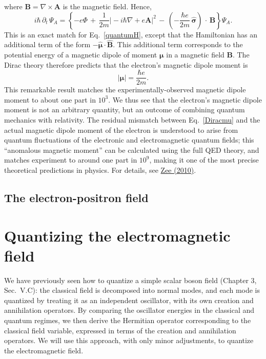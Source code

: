 \documentclass[pra,12pt]{revtex4}
\begin{document}
where $\mathbf{B} = \nabla\times\mathbf{A}$ is the magnetic field.
Hence,
\begin{equation}
  i\hbar\, \partial_t \, \Psi_A
  = \left\{-e\Phi
  \,+\, \frac{1}{2m} \big|-i\hbar\nabla +e\mathbf{A} \big|^2
  \,-\, \left(-\frac{\hbar e}{2m}\, \hat{\boldsymbol{\sigma}}\right)
  \,\cdot\, \mathbf{B} \right\} \Psi_A.
\end{equation}
This is an exact match for Eq.~\eqref{quantumH}, except that the
Hamiltonian has an additional term of the form $-
\hat{\boldsymbol{\mu}} \cdot \hat{\mathbf{B}}$.  This additional term
corresponds to the potential energy of a magnetic dipole of moment
$\boldsymbol{\mu}$ in a magnetic field $\mathbf{B}$.  The Dirac theory
therefore predicts that the electron's magnetic dipole moment is
\begin{equation}
  |\boldsymbol{\mu}| = \frac{\hbar e}{2m}.
  \label{Diracmu}
\end{equation}
This remarkable result matches the experimentally-observed magnetic
dipole moment to about one part in $10^3$.  We thus see that the
electron's magnetic dipole moment is not an arbitrary quantity, but an
outcome of combining quantum mechanics with relativity.  The residual
mismatch between Eq.~\eqref{Diracmu} and the actual magnetic dipole
moment of the electron is understood to arise from quantum
fluctuations of the electronic and electromagnetic quantum fields;
this ``anomalous magnetic moment'' can be calculated using the full
QED theory, and matches experiment to around one part in $10^9$,
making it one of the most precise theoretical predictions in physics.
For details, see \hyperref[cite:zee]{Zee (2010)}.

\subsection{The electron-positron field}

\section{Quantizing the electromagnetic field}
\label{sec:em_quantization}

We have previously seen how to quantize a simple scalar boson field
(Chapter 3, Sec.~V.C): the classical field is decomposed into normal
modes, and each mode is quantized by treating it as an independent
oscillator, with its own creation and annihilation operators.  By
comparing the oscillator energies in the classical and quantum
regimes, we then derive the Hermitian operator corresponding to the
classical field variable, expressed in terms of the creation and
annihilation operators.  We will use this approach, with only minor
adjustments, to quantize the electromagnetic field.
\end{document}
